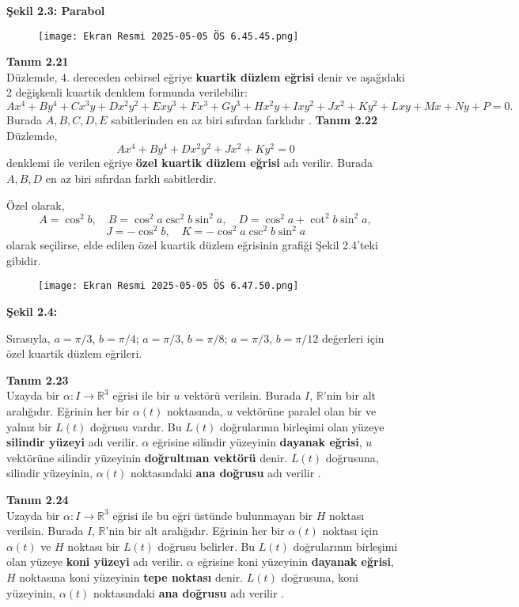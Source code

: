 \documentclass[a4paper,12pt]{article}
\begin{document}
\textbf{Şekil 2.3: Parabol}

\begin{figure}
    \centering
    \texttt{[image: Ekran Resmi 2025-05-05 ÖS 6.45.45.png]}
\end{figure}


\textbf{Tanım 2.21} \\
Düzlemde, 4. dereceden cebirsel eğriye \textbf{kuartik düzlem eğrisi} denir ve aşağıdaki 2 değişkenli kuartik denklem formunda verilebilir:
\[
Ax^4 + By^4 + Cx^3y + Dx^2y^2 + Exy^3 + Fx^3 + Gy^3 + Hx^2y + Ixy^2 + Jx^2 + Ky^2 + Lxy + Mx + Ny + P = 0.
\]
Burada $A, B, C, D, E$ sabitlerinden en az biri sıfırdan farklıdır   .
\textbf{Tanım 2.22} \\
Düzlemde,
\[
Ax^4 + By^4 + Dx^2y^2 + Jx^2 + Ky^2 = 0
\]
denklemi ile verilen eğriye \textbf{özel kuartik düzlem eğrisi} adı verilir. Burada $A, B, D$ en az biri sıfırdan farklı sabitlerdir.

Özel olarak,
\[
A = \cos^2 b, \quad B = \cos^2 a \csc^2 b \sin^2 a, \quad D = \cos^2 a + \cot^2 b \sin^2 a,
\]
\[
J = -\cos^2 b, \quad K = -\cos^2 a \csc^2 b \sin^2 a
\]
olarak seçilirse, elde edilen özel kuartik düzlem eğrisinin grafiği Şekil 2.4'teki gibidir.
\begin{figure}
    \centering
    \texttt{[image: Ekran Resmi 2025-05-05 ÖS 6.47.50.png]}
\end{figure}
\textbf{Şekil 2.4:}

Sırasıyla, $a = \pi/3$, $b = \pi/4$; $a = \pi/3$, $b = \pi/8$; $a = \pi/3$, $b = \pi/12$ değerleri için özel kuartik düzlem eğrileri.

\textbf{Tanım 2.23} \\
Uzayda bir $\alpha : I \to \mathbb{R}^3$ eğrisi ile bir $u$ vektörü verilsin. Burada $I$, $\mathbb{R}$'nin bir alt aralığıdır. Eğrinin her bir $\alpha(t)$ noktasında, $u$ vektörüne paralel olan bir ve yalnız bir $L(t)$ doğrusu vardır. Bu $L(t)$ doğrularının birleşimi olan yüzeye \textbf{silindir yüzeyi} adı verilir. $\alpha$ eğrisine silindir yüzeyinin \textbf{dayanak eğrisi}, $u$ vektörüne silindir yüzeyinin \textbf{doğrultman vektörü} denir. $L(t)$ doğrusuna, silindir yüzeyinin, $\alpha(t)$ noktasındaki \textbf{ana doğrusu} adı verilir   .

\textbf{Tanım 2.24} \\
Uzayda bir $\alpha: I \to \mathbb{R}^3$ eğrisi ile bu eğri üstünde bulunmayan bir $H$ noktası verilsin. Burada $I$, $\mathbb{R}$'nin bir alt aralığıdır. Eğrinin her bir $\alpha(t)$ noktası için $\alpha(t)$ ve $H$ noktası bir $L(t)$ doğrusu belirler. Bu $L(t)$ doğrularının birleşimi olan yüzeye \textbf{koni yüzeyi} adı verilir. $\alpha$ eğrisine koni yüzeyinin \textbf{dayanak eğrisi}, $H$ noktasına koni yüzeyinin \textbf{tepe noktası} denir. $L(t)$ doğrusuna, koni yüzeyinin, $\alpha(t)$ noktasındaki \textbf{ana doğrusu} adı verilir   .
\end{document}
